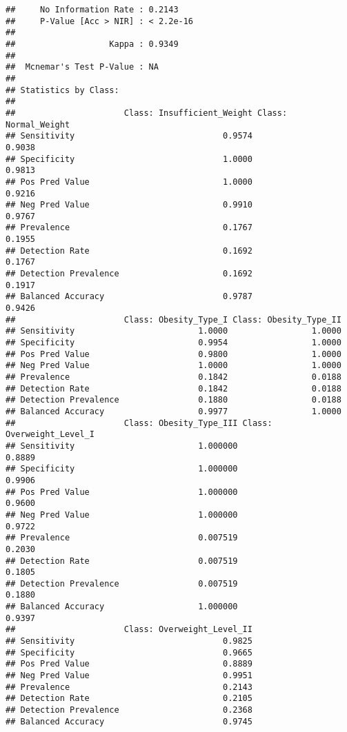 \documentclass[
]{article}
\begin{document}
\begin{verbatim}
##     No Information Rate : 0.2143          
##     P-Value [Acc > NIR] : < 2.2e-16       
##                                           
##                   Kappa : 0.9349          
##                                           
##  Mcnemar's Test P-Value : NA              
## 
## Statistics by Class:
## 
##                      Class: Insufficient_Weight Class: Normal_Weight
## Sensitivity                              0.9574               0.9038
## Specificity                              1.0000               0.9813
## Pos Pred Value                           1.0000               0.9216
## Neg Pred Value                           0.9910               0.9767
## Prevalence                               0.1767               0.1955
## Detection Rate                           0.1692               0.1767
## Detection Prevalence                     0.1692               0.1917
## Balanced Accuracy                        0.9787               0.9426
##                      Class: Obesity_Type_I Class: Obesity_Type_II
## Sensitivity                         1.0000                 1.0000
## Specificity                         0.9954                 1.0000
## Pos Pred Value                      0.9800                 1.0000
## Neg Pred Value                      1.0000                 1.0000
## Prevalence                          0.1842                 0.0188
## Detection Rate                      0.1842                 0.0188
## Detection Prevalence                0.1880                 0.0188
## Balanced Accuracy                   0.9977                 1.0000
##                      Class: Obesity_Type_III Class: Overweight_Level_I
## Sensitivity                         1.000000                    0.8889
## Specificity                         1.000000                    0.9906
## Pos Pred Value                      1.000000                    0.9600
## Neg Pred Value                      1.000000                    0.9722
## Prevalence                          0.007519                    0.2030
## Detection Rate                      0.007519                    0.1805
## Detection Prevalence                0.007519                    0.1880
## Balanced Accuracy                   1.000000                    0.9397
##                      Class: Overweight_Level_II
## Sensitivity                              0.9825
## Specificity                              0.9665
## Pos Pred Value                           0.8889
## Neg Pred Value                           0.9951
## Prevalence                               0.2143
## Detection Rate                           0.2105
## Detection Prevalence                     0.2368
## Balanced Accuracy                        0.9745
\end{verbatim}
\end{document}
